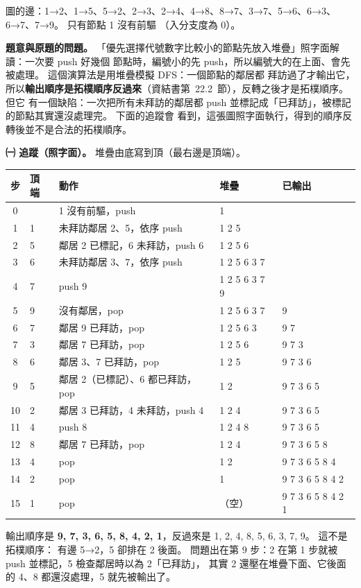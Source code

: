 \begin{pastsoln}
圖的邊：1→2、1→5、5→2、2→3、2→4、4→8、8→7、3→7、5→6、6→3、6→7、7→9。 只有節點 1 沒有前驅
（入分支度為 0）。

\textbf{題意與原題的問題。} 「優先選擇代號數字比較小的節點先放入堆疊」照字面解讀：一次要 push 好幾個
節點時，編號小的先 push，所以編號大的在上面、會先被處理。 這個演算法是用堆疊模擬 DFS：一個節點的鄰居都
拜訪過了才輸出它，所以\textbf{輸出順序是拓樸順序反過來}（資結書第~22.2~節），反轉之後才是拓樸順序。 但它
有一個缺陷：一次把所有未拜訪的鄰居都 push 並標記成「已拜訪」，被標記的節點其實還沒處理完。 下面的追蹤會
看到，這張圖照字面執行，得到的順序反轉後並不是合法的拓樸順序。

\textbf{㈠ 追蹤（照字面）。} 堆疊由底寫到頂（最右邊是頂端）。
\begin{center}
\begin{tabular}{cllll}
\toprule
步 & 頂端 & 動作 & 堆疊 & 已輸出 \\
\midrule
0 & & 1 沒有前驅，push & 1 & \\
1 & 1 & 未拜訪鄰居 2、5，依序 push & 1 2 5 & \\
2 & 5 & 鄰居 2 已標記，6 未拜訪，push 6 & 1 2 5 6 & \\
3 & 6 & 未拜訪鄰居 3、7，依序 push & 1 2 5 6 3 7 & \\
4 & 7 & push 9 & 1 2 5 6 3 7 9 & \\
5 & 9 & 沒有鄰居，pop & 1 2 5 6 3 7 & 9 \\
6 & 7 & 鄰居 9 已拜訪，pop & 1 2 5 6 3 & 9 7 \\
7 & 3 & 鄰居 7 已拜訪，pop & 1 2 5 6 & 9 7 3 \\
8 & 6 & 鄰居 3、7 已拜訪，pop & 1 2 5 & 9 7 3 6 \\
9 & 5 & 鄰居 2（已標記）、6 都已拜訪，pop & 1 2 & 9 7 3 6 5 \\
10 & 2 & 鄰居 3 已拜訪，4 未拜訪，push 4 & 1 2 4 & 9 7 3 6 5 \\
11 & 4 & push 8 & 1 2 4 8 & 9 7 3 6 5 \\
12 & 8 & 鄰居 7 已拜訪，pop & 1 2 4 & 9 7 3 6 5 8 \\
13 & 4 & pop & 1 2 & 9 7 3 6 5 8 4 \\
14 & 2 & pop & 1 & 9 7 3 6 5 8 4 2 \\
15 & 1 & pop & （空） & 9 7 3 6 5 8 4 2 1 \\
\bottomrule
\end{tabular}
\end{center}
輸出順序是 \textbf{9, 7, 3, 6, 5, 8, 4, 2, 1}，反過來是 1, 2, 4, 8, 5, 6, 3, 7, 9。 這不是拓樸順序：
有邊 5→2，5 卻排在 2 後面。 問題出在第 9 步：2 在第 1 步就被 push 並標記，5 檢查鄰居時以為 2「已拜訪」，
其實 2 還壓在堆疊下面、它後面的 4、8 都還沒處理，5 就先被輸出了。


\end{pastsoln}
